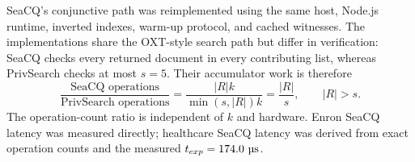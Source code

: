 \documentclass[journal]{IEEEtran}
\theoremstyle{tight}
\theoremstyle{remark}
\theoremstyle{plain}
\begin{document}
SeaCQ's conjunctive path was reimplemented using the same host, Node.js runtime, inverted indexes, warm-up protocol, and cached witnesses. The implementations share the OXT-style search path but differ in verification: SeaCQ checks every returned document in every contributing list, whereas PrivSearch checks at most \(s=5\). Their accumulator work is therefore
\begin{equation}
\frac{\text{SeaCQ operations}}{\text{PrivSearch operations}}
=
\frac{|R|k}{\min(s,|R|)k}
=
\frac{|R|}{s},
\qquad |R|>s.
\label{eq:opsratio}
\end{equation}
The operation-count ratio is independent of \(k\) and hardware. Enron SeaCQ latency was measured directly; healthcare SeaCQ latency was derived from exact operation counts and the measured \(t_{exp}=174.0~\text{\textmu s}\).
\end{document}
